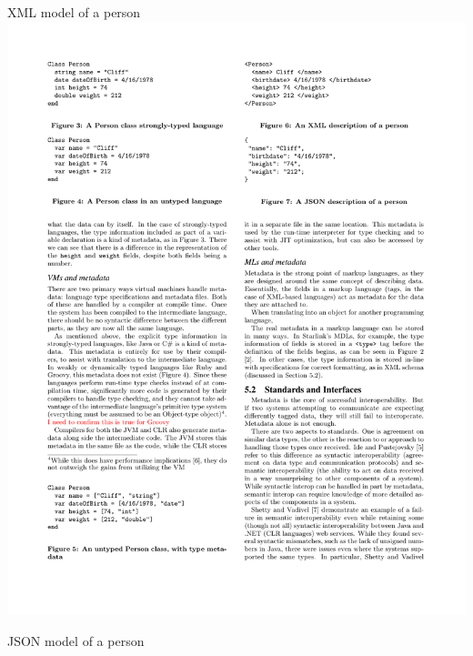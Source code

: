 \documentclass{beamer}
\newcommand{\linespace}{\vskip 0.25cm}
\begin{document}
\begin{frame}
\begin{columns}
\begin{column}{0.55\textwidth}
   \tiny{XML model of a person}
   \linespace
   \linespace
   \includegraphics[scale=1]{graphics/JSONCliff.pdf}
   
   \tiny{JSON model of a person}
  \end{column}
  \end{columns}
  
\end{frame}
\end{document}
